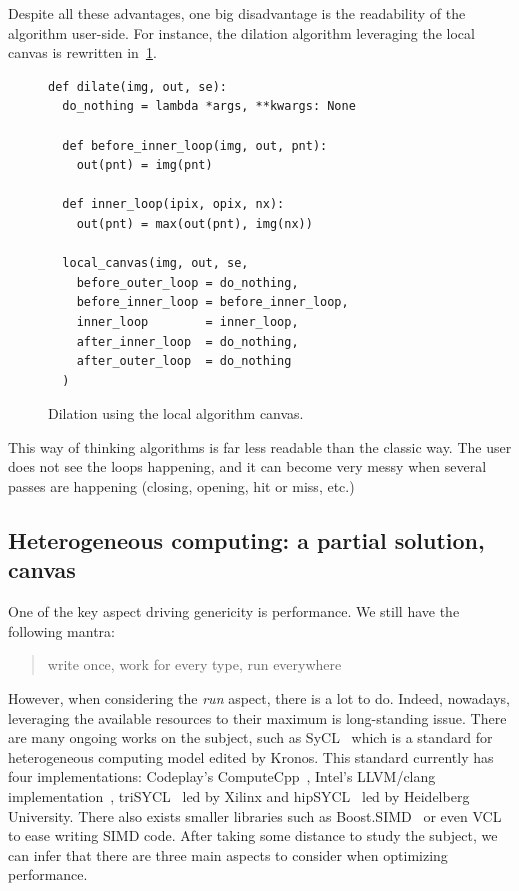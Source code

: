 Despite all these advantages, one big disadvantage is the readability of the algorithm user-side. For instance, the
dilation algorithm leveraging the local canvas is rewritten in~\cref{code:local.algorithm.dilate}.

\begin{figure}[htbp]
  \centering
  \begin{verbatim}
def dilate(img, out, se):
  do_nothing = lambda *args, **kwargs: None

  def before_inner_loop(img, out, pnt):
    out(pnt) = img(pnt)

  def inner_loop(ipix, opix, nx):
    out(pnt) = max(out(pnt), img(nx))

  local_canvas(img, out, se,
    before_outer_loop = do_nothing,
    before_inner_loop = before_inner_loop,
    inner_loop        = inner_loop,
    after_inner_loop  = do_nothing,
    after_outer_loop  = do_nothing
  )
  \end{verbatim}

  \caption{Dilation using the local algorithm canvas.}
  \label{code:local.algorithm.dilate}
\end{figure}

This way of thinking algorithms is far less readable than the classic way. The user does not see the loops happening,
and it can become very messy when several passes are happening (closing, opening, hit or miss, etc.)


\subsection{Heterogeneous computing: a partial solution, canvas}
\label{subsec:heterogeneous}

One of the key aspect driving genericity is performance. We still have the following mantra: \blockquote{write once,
  work for every type, run everywhere}. However, when considering the \emph{run} aspect, there is a lot to do. Indeed,
nowadays, leveraging the available resources to their maximum is long-standing issue. There are many ongoing works on
the subject, such as SyCL~\parencite{brown.2019.heterogeneous,wong.2019.heterogeneous} which is a standard for
heterogeneous computing model edited by Kronos. This standard currently has four implementations: Codeplay's
ComputeCpp~\parencite{codeplay.2021.computecpp}, Intel's LLVM/clang implementation~\parencite{intel-llvm.2021.sycl},
triSYCL~\parencite{xilinx.2021.triSYCL} led by Xilinx and hipSYCL~\parencite{aksel.2020.hipsycl} led by Heidelberg
University. There also exists smaller libraries such as Boost.SIMD~\parencite{esterie.2014.boostsimd} or even
VCL~\parencite{fog.2013.vcl} to ease writing SIMD code. After taking some distance to study the subject, we can infer
that there are three main aspects to consider when optimizing performance.

